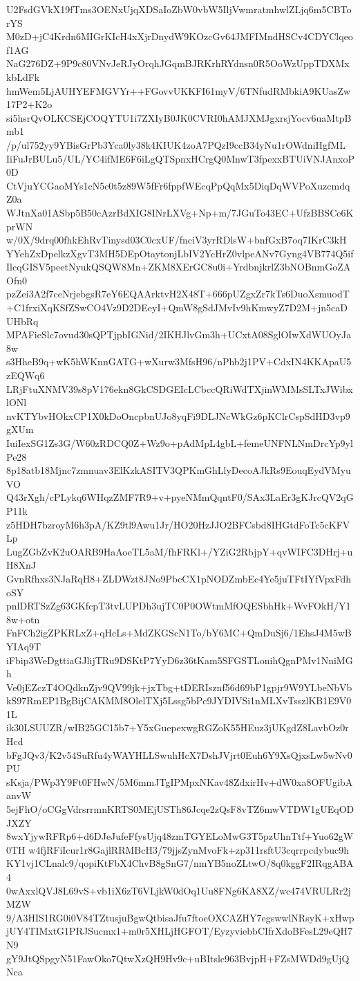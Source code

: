 U2FsdGVkX19fTms3OENxUjqXDSaIoZbW0vbW5IljVwmratmhwlZLjq6m5CBTorYS
M0zD+jC4Krdn6MIGrKIcH4xXjrDnydW9KOzcGv64JMFIMndHSCv4CDYClqeof1AG
NaG276DZ+9P9c80VNvJeRJyOrqhJGqmBJRKrhRYdnsn0R5OoWzUppTDXMxkbLdFk
hmWem5LjAUHYEFMGVYr++FGovvUKKFI61myV/6TNfudRMbkiA9KUasZw17P2+K2o
si5hsrQvOLKCSEjCOQYTU1i7ZXIyB0JK0CVRI0hAMJXMJgxrsjYocv6uaMtpBmb1
/p/ul752yy9YBisGrPb3Yca0ly38k4KIUK4zoA7PQzI9ccB34yNu1rOWdniHgfML
IiFuJrBULu5/UL/YC4ifME6F6iLgQTSpnxHCrgQ0MnwT3fpexxBTUiVNJAnxoP0D
CtVjuYCGaoMYs1cN5c0t5z89W5fFr6fppfWEcqPpQqMx5DiqDqWVPoXuzcmdqZ0a
WJtnXa01ASbp5B50cAzrBdXIG8INrLXVg+Np+m/7JGuTo43EC+UfzBBSCe6KprWN
w/0X/9drq00fhkEhRvTinysd03C0cxUF/fnciV3yrRDlsW+bnfGxB7oq7IKrC3kH
YYehZxDpelkzXgvT3MH5DEpOtaytonjLbIV2YcHrZ0vlpeANv7Gyng4VB774Q5if
IlcqGISV5peetNyukQSQW8Mn+ZKM8XErGC8u0i+YrdbnjkrlZ3bNOBnmGoZAOfn0
pzZei3A2f7ceNrjebgsR7eY6EQAArktvH2X48T+666pUZgxZr7kTs6DuoXsmuodT
+C1frxiXqKSfZSwCO4Vz9D2DEeyI+QmW8gSdJMvIv9hKmwyZ7D2M+jn5caDUHbRq
MPAFieSlc7ovud30sQPTjpbIGNid/2IKHJlvGm3h+UCxtA08SglOIwXdWUOyJa8w
s3HheB9q+wK5hWKnnGATG+wXurw3MfsH96/nPhb2j1PV+CdxIN4KKApaU5zEQWq6
LRjFtuXNMV39s8pV176ekn8GkCSDGEIcLCbccQRiWdTXjinWMMsSLTxJWibxlONl
nvKTYbvHOkxCP1X0kDoOncpbnUJo8yqFi9DLJNcWkGz6pKClrCspSdHD3vp9gXUm
IuiIexSG1Zs3G/W60zRDCQ0Z+Wz9o+pAdMpL4gbL+femeUNFNLNmDrcYp9ylPe28
8p18atb18Mjnc7zmnuav3ElKzkASITV3QPKmGhLlyDecoAJkRs9EouqEydVMyuVO
Q43rXgh/cPLykq6WHqzZMF7R9+v+pyeNMmQqntF0/SAx3LaEr3gKJrcQV2qGP11k
z5HDH7bzroyM6h3pA/KZ9tl9Awu1Jr/HO20HzJJO2BFCsbd8IHGtdFoTc5cKFVLp
LugZGbZvK2uOARB9HaAoeTL5aM/fhFRKl+/YZiG2RbjpY+qvWIFC3DHrj+uH8XnJ
GvnRfhxs3NJaRqH8+ZLDWzt8JNo9PbcCX1pNODZmbEc4Ye5juTFtIYfVpxFdhoSY
pnlDRTSzZg63GKfcpT3tvLUPDh3ujTC0P0OWtmMfOQESbhHk+WvFOkH/Y18w+otn
FnFCh2igZPKRLxZ+qHcLs+MdZKGScN1To/bY6MC+QmDuSj6/1EhsJ4M5wBYIAq9T
iFbip3WeDgttiaGJlijTRu9DSKtP7YyD6z36tKam5SFGSTLonihQgnPMv1NniMGh
Ve0jEZczT4OQdknZjv9QV99jk+jxTbg+tDERIsznf56d69bP1gpjr9W9YLbeNbVb
kS97RmEP1BgBijCAKMM8OlelTXj5Lssg5bPc9JYDIVSi1nMLXvTsszlKB1E9V01L
ik30LSUUZR/wIB25GC15b7+Y5xGuepexwgRGZoK55HEuz3jUKgdZ8LavbOz0rHcd
bFgJQv3/K2v54SuRfu4yWAYHLLSwuhHcX7DshJVjrt0Euh6Y9XsQjxsLw5wNv0PU
sKsja/PWp3Y9Ft0FHwN/5M6mmJTgIPMpxNKav48ZdxirHv+dW0xa8OFUgibAanvW
5ejFhO/oCGgVdrsrrmnKRTS0MEjUSTh86Jcqe2zQsF8vTZ6mwVTDW1gUEqODJXZY
8wxYjywRFRp6+d6DJeJufeFfysUjq48zmTGYELoMwG3T5pzUhnTtf+Yuo62gW0TH
w4fjRFiIcur1r8GajlRRMBcH3/79jjsZynMvoFk+zp311rsftU3cqrrpcdybuc9h
KY1vj1CLnalc9/qopiKtFbX4ChvB8gSnG7/nmYB5noZLtwO/8q0kggF2IRqgABA4
0wAxxlQVJ8L69vS+vb1iX6zT6VLjkW0dOq1Uu8FNg6KA8XZ/wc474VRULRr2jMZW
9/A3HIS1RG0i0V84TZtusjuBgwQtbisaJfu7ftoeOXCAZHY7egswwlNRsyK+xHwp
jUY4TIMxtG1PRJSucmx1+m0r5XHLjHGFOT/EyzyviebbCIfrXdoBFesL29eQH7N9
gY9JtQSpgyN51FawOko7QtwXzQH9Hv9c+uBItslc963BvjpH+FZsMWDd9gUjQNca

